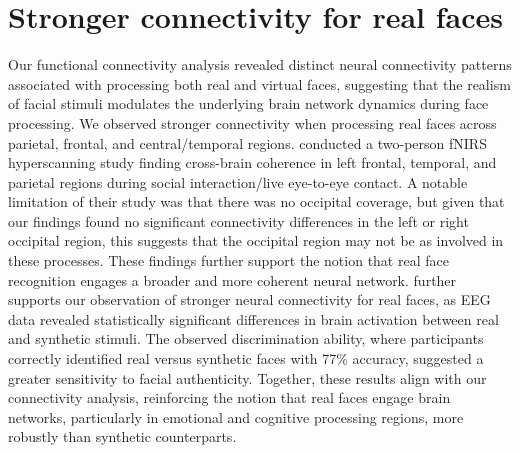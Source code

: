 \section{Stronger connectivity for real faces}
Our functional connectivity analysis revealed distinct neural connectivity patterns associated with processing both real and virtual faces, suggesting that the realism of facial stimuli modulates the underlying brain network dynamics during face processing.
We observed stronger connectivity when processing real faces across parietal, frontal, and central/temporal regions. 
\cite{hirsch_frontal_2017} conducted a two-person fNIRS hyperscanning study finding cross-brain coherence in left frontal, temporal, and parietal regions during social interaction/live eye-to-eye contact. 
A notable limitation of their study was that there was no occipital coverage, but given that our findings found no significant connectivity differences in the left or right occipital region, this suggests that the occipital region may not be as involved in these processes.
These findings further support the notion that real face recognition engages a broader and more coherent neural network. 
\cite{tarchi_electroencephalographic_2023} further supports our observation of stronger neural connectivity for real faces, as EEG data revealed statistically significant differences in brain activation between real and synthetic stimuli. 
The observed discrimination ability, where participants correctly identified real versus synthetic faces with 77\% accuracy, suggested a greater sensitivity to facial authenticity. 
Together, these results align with our connectivity analysis, reinforcing the notion that real faces engage brain networks, particularly in emotional and cognitive processing regions, more robustly than synthetic counterparts.

